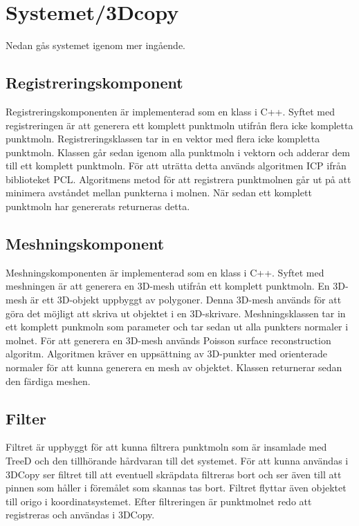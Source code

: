 \documentclass[a4paper,titlepage,12pt]{article}
\begin{document}
\section{Systemet/3Dcopy} %
	Nedan gås systemet igenom mer ingående.
	
	\subsection{Registreringskomponent}
		Registreringskomponenten är implementerad som en klass i C++. Syftet med registreringen är att generera ett komplett punktmoln utifrån flera icke kompletta punktmoln. Registreringsklassen tar in en vektor med flera icke kompletta punktmoln. Klassen går sedan igenom alla punktmoln i vektorn och adderar dem till ett komplett punktmoln. För att uträtta detta används algoritmen ICP ifrån biblioteket PCL. Algoritmens metod för att registrera punktmolnen går ut på att minimera avståndet mellan punkterna i molnen. När sedan ett komplett punktmoln har genererats returneras detta.
	
	\subsection{Meshningskomponent}
		Meshningskomponenten är implementerad som en klass i C++. Syftet med meshningen är att generera en 3D-mesh utifrån ett komplett punktmoln. En 3D-mesh är ett 3D-objekt uppbyggt av polygoner. Denna 3D-mesh används för att göra det möjligt att skriva ut objektet i en 3D-skrivare. Meshningsklassen tar in ett komplett punkmoln som parameter och tar sedan ut alla punkters normaler i molnet. För att generera en 3D-mesh används Poisson surface reconstruction algoritm. Algoritmen kräver en uppsättning av 3D-punkter med orienterade normaler för att kunna generera en mesh av objektet. Klassen returnerar sedan den färdiga meshen.
	
	\subsection{Filter}
		Filtret är uppbyggt för att kunna filtrera punktmoln som är insamlade med TreeD och den tillhörande hårdvaran till det systemet. För att kunna användas i 3DCopy ser filtret till att eventuell skräpdata filtreras bort och ser även till att pinnen som håller i föremålet som skannas tas bort. Filtret flyttar även objektet till origo i koordinatsystemet. Efter filtreringen är punktmolnet redo att registreras och användas i 3DCopy.
		
\end{document}

